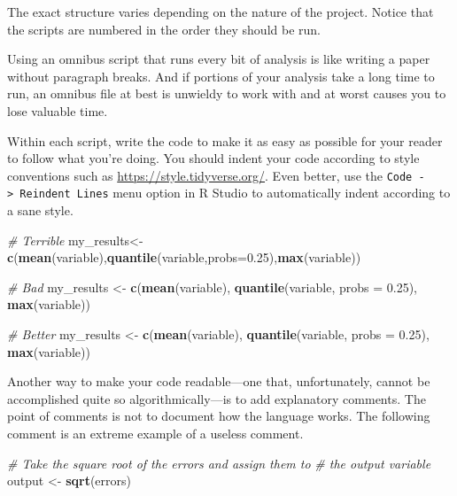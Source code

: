 \documentclass[12pt,oneside,openany]{book}
\newenvironment{Shaded}{\begin{snugshade}}{\end{snugshade}}
\newcommand{\KeywordTok}[1]{\textcolor[rgb]{0.13,0.29,0.53}{\textbf{#1}}}
\newcommand{\DataTypeTok}[1]{\textcolor[rgb]{0.13,0.29,0.53}{#1}}
\newcommand{\FloatTok}[1]{\textcolor[rgb]{0.00,0.00,0.81}{#1}}
\newcommand{\StringTok}[1]{\textcolor[rgb]{0.31,0.60,0.02}{#1}}
\newcommand{\CommentTok}[1]{\textcolor[rgb]{0.56,0.35,0.01}{\textit{#1}}}
\newcommand{\NormalTok}[1]{#1}
\begin{document}
The exact structure varies depending on the nature of the project.
Notice that the scripts are numbered in the order they should be run.

Using an omnibus script that runs every bit of analysis is like writing
a paper without paragraph breaks. And if portions of your analysis take
a long time to run, an omnibus file at best is unwieldy to work with and
at worst causes you to lose valuable time.

Within each script, write the code to make it as easy as possible for
your reader to follow what you're doing. You should indent your code
according to style conventions such as
\url{https://style.tidyverse.org/}. Even better, use the
\texttt{Code\ -\textgreater{}\ Reindent\ Lines} menu option in R Studio
to automatically indent according to a sane style.

\begin{Shaded}
\begin{Highlighting}[]
\CommentTok{# Terrible}
\NormalTok{my_results<-}\KeywordTok{c}\NormalTok{(}\KeywordTok{mean}\NormalTok{(variable),}\KeywordTok{quantile}\NormalTok{(variable,}\DataTypeTok{probs=}\FloatTok{0.25}\NormalTok{),}\KeywordTok{max}\NormalTok{(variable))}

\CommentTok{# Bad}
\NormalTok{my_results <-}\StringTok{ }\KeywordTok{c}\NormalTok{(}\KeywordTok{mean}\NormalTok{(variable),}
\KeywordTok{quantile}\NormalTok{(variable,}
\DataTypeTok{probs =} \FloatTok{0.25}\NormalTok{),}
\KeywordTok{max}\NormalTok{(variable))}

\CommentTok{# Better}
\NormalTok{my_results <-}\StringTok{ }\KeywordTok{c}\NormalTok{(}\KeywordTok{mean}\NormalTok{(variable),}
                \KeywordTok{quantile}\NormalTok{(variable,}
                         \DataTypeTok{probs =} \FloatTok{0.25}\NormalTok{),}
                \KeywordTok{max}\NormalTok{(variable))}
\end{Highlighting}
\end{Shaded}

Another way to make your code readable---one that, unfortunately, cannot
be accomplished quite so algorithmically---is to add explanatory
comments. The point of comments is not to document how the language
works. The following comment is an extreme example of a useless comment.

\begin{Shaded}
\begin{Highlighting}[]
\CommentTok{# Take the square root of the errors and assign them to}
\CommentTok{# the output variable}
\NormalTok{output <-}\StringTok{ }\KeywordTok{sqrt}\NormalTok{(errors)}
\end{Highlighting}
\end{Shaded}
\end{document}
